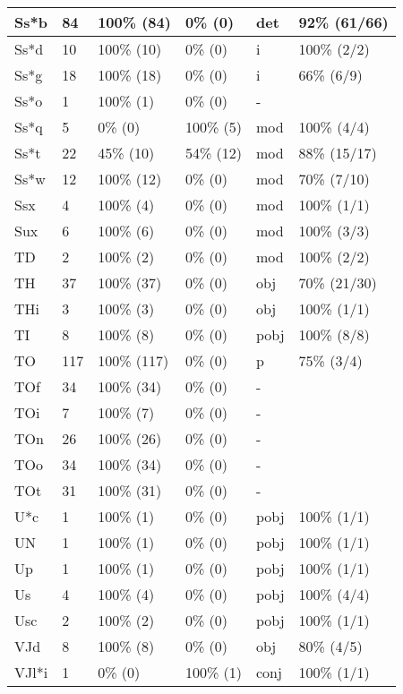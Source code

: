 \begin{figure*}
\begin{tabular}{|l|l|l|l||l|l|}
\hline
 Ss*b & 84 & 100\% (84) & 0\% (0) & det & 92\% (61/66) \\ 
\hline
 Ss*d & 10 & 100\% (10) & 0\% (0) & i & 100\% (2/2) \\ 
\hline
 Ss*g & 18 & 100\% (18) & 0\% (0) & i & 66\% (6/9) \\ 
\hline
 Ss*o & 1 & 100\% (1) & 0\% (0) & - &  \\ 
\hline
 Ss*q & 5 & 0\% (0) & 100\% (5) & mod & 100\% (4/4) \\ 
\hline
 Ss*t & 22 & 45\% (10) & 54\% (12) & mod & 88\% (15/17) \\ 
\hline
 Ss*w & 12 & 100\% (12) & 0\% (0) & mod & 70\% (7/10) \\ 
\hline
 Ssx & 4 & 100\% (4) & 0\% (0) & mod & 100\% (1/1) \\ 
\hline
 Sux & 6 & 100\% (6) & 0\% (0) & mod & 100\% (3/3) \\ 
\hline
 TD & 2 & 100\% (2) & 0\% (0) & mod & 100\% (2/2) \\ 
\hline
 TH & 37 & 100\% (37) & 0\% (0) & obj & 70\% (21/30) \\ 
\hline
 THi & 3 & 100\% (3) & 0\% (0) & obj & 100\% (1/1) \\ 
\hline
 TI & 8 & 100\% (8) & 0\% (0) & pobj & 100\% (8/8) \\ 
\hline
 TO & 117 & 100\% (117) & 0\% (0) & p & 75\% (3/4) \\ 
\hline
 TOf & 34 & 100\% (34) & 0\% (0) & - &  \\ 
\hline
 TOi & 7 & 100\% (7) & 0\% (0) & - &  \\ 
\hline
 TOn & 26 & 100\% (26) & 0\% (0) & - &  \\ 
\hline
 TOo & 34 & 100\% (34) & 0\% (0) & - &  \\ 
\hline
 TOt & 31 & 100\% (31) & 0\% (0) & - &  \\ 
\hline
 U*c & 1 & 100\% (1) & 0\% (0) & pobj & 100\% (1/1) \\ 
\hline
 UN & 1 & 100\% (1) & 0\% (0) & pobj & 100\% (1/1) \\ 
\hline
 Up & 1 & 100\% (1) & 0\% (0) & pobj & 100\% (1/1) \\ 
\hline
 Us & 4 & 100\% (4) & 0\% (0) & pobj & 100\% (4/4) \\ 
\hline
 Usc & 2 & 100\% (2) & 0\% (0) & pobj & 100\% (1/1) \\ 
\hline
 VJd & 8 & 100\% (8) & 0\% (0) & obj & 80\% (4/5) \\ 
\hline
 VJl*i & 1 & 0\% (0) & 100\% (1) & conj & 100\% (1/1) \\ 
\hline
\end{tabular}
\end{figure*}
